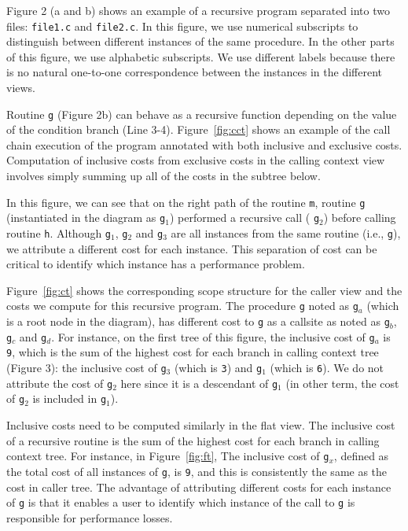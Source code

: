 \documentclass[a4paper,11pt]{article}
\begin{document}
 Figure 2 (a and b) shows an example of a recursive program separated into two files: 
\texttt{file1.c} and \texttt{file2.c}.  In this figure, we use numerical subscripts to distinguish between different instances of the same procedure. In the other parts of this figure, we use alphabetic subscripts.  We use different labels because there is no natural one-to-one correspondence between the instances in the different views.  

 Routine \texttt{g} (Figure 2b) can behave as a recursive function depending on the value of the condition branch (Line 3-4). Figure~\ref{fig:cct}  shows an example of the call chain execution of the program annotated with both inclusive and exclusive costs. Computation of inclusive costs from exclusive costs in the calling context view involves simply summing up all of the costs in the subtree below. 

 In this figure, we can see that on the right path of the routine 
\texttt{m}, routine 
\texttt{g} (instantiated in the diagram as 
\texttt{g$_1$}) performed a recursive call (
\texttt{g$_2$}) before calling routine 
\texttt{h}. Although 
\texttt{g$_1$}, 
\texttt{g$_2$} and 
\texttt{g$_3$} are all instances from the same routine (i.e., 
\texttt{g}), we attribute  a different cost for each instance. This separation of cost can be critical to identify which instance has a performance problem.  

 Figure~\ref{fig:ct} shows the corresponding scope structure for the caller view and the costs we compute for this recursive program. The procedure 
\texttt{g} noted as 
\texttt{g$_a$} (which is a root node in the diagram), has different cost to 
\texttt{g} as a callsite as noted as 
\texttt{g$_b$}, 
\texttt{g$_c$} and 
\texttt{g$_d$}.  For instance, on the first tree of this figure, the inclusive cost of  
\texttt{g$_a$} is 
\texttt{9}, which is the sum of the highest  cost for each branch in calling context tree (Figure 3):  the inclusive cost of  
\texttt{g$_3$} (which is 
\texttt{3}) and 
\texttt{g$_1$} (which is 
\texttt{6}). We do not attribute the cost of 
\texttt{g$_2$} here since it is a descendant of 
\texttt{g$_1$} (in other term, the cost of 
\texttt{g$_2$} is included in 
\texttt{g$_1$}).   

 Inclusive costs need to be computed similarly in the flat view. The inclusive cost of a recursive routine is the sum of the highest cost for each branch in calling context tree. For instance, in Figure~\ref{fig:ft}, The inclusive cost of 
\texttt{g$_x$}, defined as the total cost of all instances of 
\texttt{g}, is 
\texttt{9}, and this is consistently the same as the cost in caller tree. The advantage of attributing different costs for each instance of 
\texttt{g} is that it enables a user to identify which instance of the call to 
\texttt{g} is responsible for performance losses.  
\end{document}
